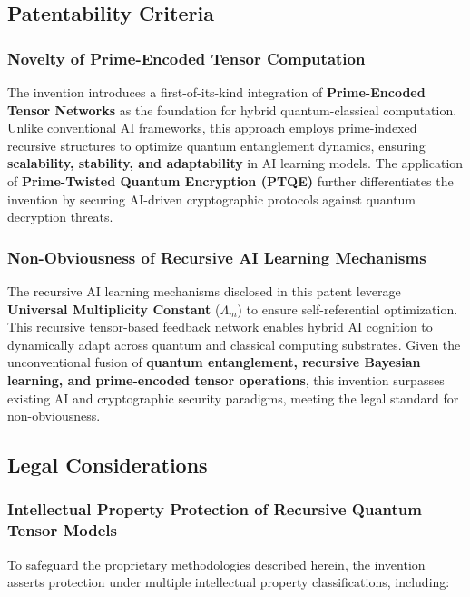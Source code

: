 \documentclass{article}
\theoremstyle{plain}
\begin{document}
\subsection{Patentability Criteria}

\subsubsection{Novelty of Prime-Encoded Tensor Computation}

The invention introduces a first-of-its-kind integration of \textbf{Prime-Encoded Tensor Networks} as the foundation for hybrid quantum-classical computation. Unlike conventional AI frameworks, this approach employs prime-indexed recursive structures to optimize quantum entanglement dynamics, ensuring \textbf{scalability, stability, and adaptability} in AI learning models. The application of \textbf{Prime-Twisted Quantum Encryption (PTQE)} further differentiates the invention by securing AI-driven cryptographic protocols against quantum decryption threats.

\subsubsection{Non-Obviousness of Recursive AI Learning Mechanisms}

The recursive AI learning mechanisms disclosed in this patent leverage \textbf{Universal Multiplicity Constant} ($\Lambda_m$) to ensure self-referential optimization. This recursive tensor-based feedback network enables hybrid AI cognition to dynamically adapt across quantum and classical computing substrates. Given the unconventional fusion of \textbf{quantum entanglement, recursive Bayesian learning, and prime-encoded tensor operations}, this invention surpasses existing AI and cryptographic security paradigms, meeting the legal standard for non-obviousness.

\subsection{Legal Considerations}

\subsubsection{Intellectual Property Protection of Recursive Quantum Tensor Models}

To safeguard the proprietary methodologies described herein, the invention asserts protection under multiple intellectual property classifications, including:
\end{document}
